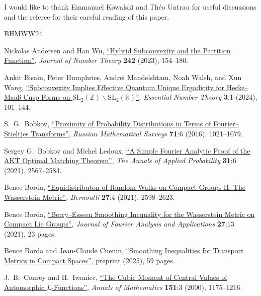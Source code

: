 \documentclass[11pt,a4paper]{amsart}
\numberwithin{equation}{section}
\theoremstyle{remark}
\theoremstyle{definition}
\begin{document}
I would like to thank Emmanuel Kowalski and Th\'{e}o Untrau for useful discussions and the referee for their careful reading of this paper.


\hypersetup{bookmarksdepth}


\begin{thebibliography}{BHMWW24}

 Nickolas Andersen and Han Wu, \href{https://doi.org/10.1016/j.jnt.2022.07.012}{``Hybrid Subconvexity and the Partition Function''}, \textit{Journal of Number Theory} \textbf{242} (2023), 154--180.

 Ankit Bisain, Peter Humphries, Andrei Mandelshtam, Noah Walsh, and Xun Wang, \href{https://doi.org/10.2140/ent.2024.3.63}{``Subconvexity Implies Effective Quantum Unique Ergodicity for Hecke--Maa\ss{} Cusp Forms on $\mathrm{SL}_2(\mathbb{Z}) \backslash \mathrm{SL}_2(\mathbb{R})$''}, \textit{Essential Number Theory} \textbf{3}:1 (2024), 101--144.

 S.~G.~Bobkov, \href{https://doi.org/10.1070/RM9749}{``Proximity of Probability Distributions in Terms of Fourier--Stieltjes Transforms''}, \textit{Russian Mathematical Surveys} \textbf{71}:6 (2016), 1021--1079.

 Sergey G.~Bobkov and Michel Ledoux, \href{https://doi.org/10.1214/20-AAP1656}{``A Simple Fourier Analytic Proof of the AKT Optimal Matching Theorem''}, \textit{The Annals of Applied Probability} \textbf{31}:6 (2021), 2567--2584.

 Bence Borda, \href{https://doi.org/10.3150/21-BEJ1324}{``Equidistributon of Random Walks on Compact Groups II. The Wasserstein Metric''}, \textit{Bernoulli} \textbf{27}:4 (2021), 2598--2623.

 Bence Borda, \href{https://doi.org/10.1007/s00041-020-09803-0}{``Berry--Esseen Smoothing Inequality for the Wasserstein Metric on Compact Lie Groups''}, \textit{Journal of Fourier Analysis and Applications} \textbf{27}:13 (2021), 23 pages.

 Bence Borda and Jean-Claude Cuenin, \href{https://arxiv.org/abs/2510.21380v1}{``Smoothing Inequalities for Transport Metrics in Compact Spaces''}, preprint (2025), 59 pages.

 J.~B.~Conrey and H.~Iwaniec, \href{https://doi.org/10.2307/121132}{``The Cubic Moment of Central Values of Automorphic $L$-Functions''}, \textit{Annals of Mathematics} \textbf{151}:3 (2000), 1175--1216.


\end{thebibliography}
\end{document}
